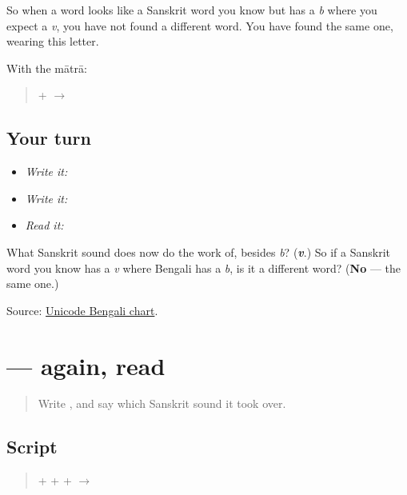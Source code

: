 So when a word looks like a Sanskrit word you know but has a \emph{b} where you expect a \emph{v}, you have not found a different word. You have found the same one, wearing this letter.

With the mātrā:

\begin{quote}
\textbf{} + \textbf{} $\to$ \textbf{}
\end{quote}

\subsection*{Your turn}
\begin{itemize}
\raggedright
  \item \emph{Write it:} 
  \item \emph{Write it:} 
  \item \emph{Read it:} 
\end{itemize}

\begin{tcolorbox}[breakable,colback=teal!4,colframe=teal!35!black,title={Before you move on}]
What Sanskrit sound does \textbf{} now do the work of, besides \emph{b}? (\emph{\textbf{v}}.) So if a Sanskrit word you know has a \emph{v} where Bengali has a \emph{b}, is it a different word? (\textbf{No} — the same one.)

Source: \href{https://www.unicode.org/charts/PDF/U0980.pdf}{Unicode Bengali chart}.
\end{tcolorbox}
\section[\texorpdfstring{\bn{আবার} (ābār)}{আবার (ābār)}]{ — again, read}

\label{lesson:BN-W03-abar-read}



\begin{quote}
Write \textbf{}, and say which Sanskrit sound it took over.
\end{quote}

\subsection*{Script}
\begin{quote}
\textbf{} + \textbf{} + \textbf{} + \textbf{} $\to$ \textbf{}
\end{quote}

